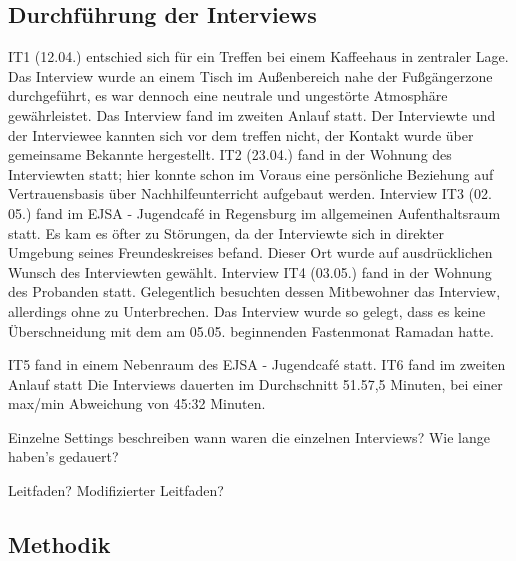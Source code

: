 \subsection{Durchführung der Interviews}


IT1 (12.04.) entschied sich für ein Treffen bei einem Kaffeehaus in zentraler Lage. Das Interview wurde an einem Tisch im Außenbereich nahe der Fußgängerzone durchgeführt, es war dennoch eine neutrale und ungestörte Atmosphäre gewährleistet. Das Interview fand im zweiten Anlauf statt. Der Interviewte und der Interviewee kannten sich vor dem treffen nicht, der Kontakt wurde über gemeinsame Bekannte hergestellt.\newline
IT2 (23.04.) fand in der Wohnung des Interviewten statt; hier konnte schon im Voraus eine persönliche Beziehung auf Vertrauensbasis über Nachhilfeunterricht aufgebaut werden.
Interview IT3 (02. 05.) fand im EJSA - Jugendcafé in Regensburg im allgemeinen Aufenthaltsraum statt. Es kam es öfter zu Störungen, da der Interviewte sich in direkter Umgebung seines Freundeskreises befand. Dieser Ort wurde auf ausdrücklichen Wunsch des Interviewten gewählt.\newline
Interview IT4 (03.05.) fand in der Wohnung des Probanden statt. Gelegentlich besuchten dessen Mitbewohner das Interview, allerdings ohne zu Unterbrechen. Das Interview wurde so gelegt, dass es keine Überschneidung mit dem am 05.05. beginnenden Fastenmonat Ramadan hatte.\newline

IT5 fand in einem Nebenraum des EJSA - Jugendcafé statt.
IT6 fand im zweiten Anlauf statt
Die Interviews dauerten im Durchschnitt 51.57,5 Minuten, bei einer max/min Abweichung von 45:32 Minuten.



Einzelne Settings beschreiben
wann waren die einzelnen Interviews?
Wie lange haben's gedauert?

Leitfaden?
Modifizierter Leitfaden?

\subsection{Methodik}



